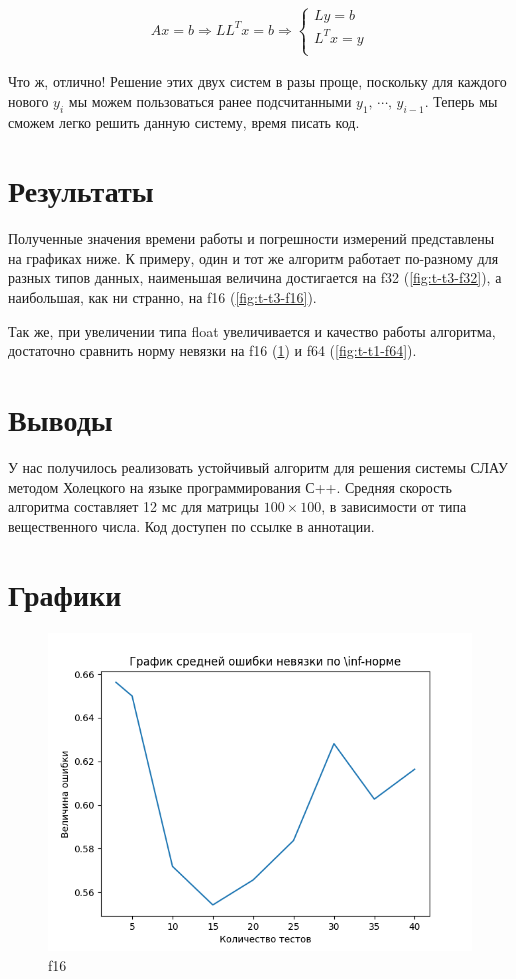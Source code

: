 \documentclass[12pt]{article}
\begin{document}
	\begin{align}
	A x = b \Longrightarrow L L^T x = b \Longrightarrow  
	\begin{cases}
		L y = b \\
		L^T x = y \\
	\end{cases}
	\end{align}
	
	Что ж, отлично! Решение этих двух систем в разы проще, поскольку для каждого нового $y_i$ мы можем пользоваться ранее подсчитанными $y_1,\, \cdots,\, y_{i-1}$. Теперь мы сможем легко решить данную систему, время писать код.
	
	
	\section{Результаты}
	Полученные значения времени работы и погрешности измерений представлены на графиках ниже. К примеру, один и тот же алгоритм работает по-разному для разных типов данных, наименьшая величина достигается на f32 (\ref{fig:t-t3-f32}), а наибольшая, как ни странно, на f16 (\ref{fig:t-t3-f16}).
	
	Так же, при увеличении типа float увеличивается и качество работы алгоритма, достаточно сравнить норму невязки на f16 (\ref{fig:t-t1-f16}) и f64 (\ref{fig:t-t1-f64}).
	
	\section{Выводы}
	У нас получилось реализовать устойчивый алгоритм для решения системы СЛАУ методом Холецкого на языке программирования С++. Средняя скорость алгоритма составляет 12 мс для матрицы $100 \times 100$, в зависимости от типа вещественного числа. Код доступен по ссылке в аннотации.
	
	\section{Графики}
	
	\begin{figure}[h]
		\centering
		\includegraphics[width=16cm]{"../plots/plot-total-t1-f16.png"}
		\caption{f16}
		\label{fig:t-t1-f16}
	\end{figure}
\end{document}
